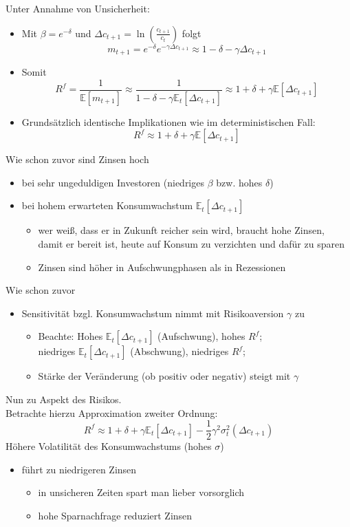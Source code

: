 \documentclass[12pt]{extreport} %
\theoremstyle{named}
\theoremstyle{nnamed}
\theoremstyle{itshape}
\theoremstyle{normal}
\begin{document}
Unter Annahme von Unsicherheit:	
\begin{itemize}
	\item Mit $\beta = e^{-\delta}$ und $\Delta c_{t+1} = \ln \left( \frac{c_{t+1}}{c_t} \right)$ folgt
		$$ m_{t+1} = e^{-\delta} e^{-\gamma \Delta c_{t+1}} \approx 1 - \delta - \gamma \Delta c_{t+1} $$
	\item Somit
		$$ R^f = \frac{1}{\mathbb{E}[m_{t+1}]} \approx \frac{1}{1 - \delta - \gamma \mathbb{E}_t[\Delta c_{t+1}]} \approx 1 + \delta + \gamma \mathbb{E}[\Delta c_{t+1}] $$
	\item Grundsätzlich identische Implikationen wie im deterministischen Fall:
		$$ R^f \approx 1 + \delta + \gamma \mathbb{E} [\Delta c_{t+1}] $$
\end{itemize}
Wie schon zuvor sind Zinsen hoch
\begin{itemize}
			\item bei sehr ungeduldigen Investoren (niedriges $\beta$ bzw. hohes $\delta$)
			\item bei hohem erwarteten Konsumwachstum $\mathbb{E}_t[\Delta c_{t+1}]$
				\begin{itemize}
					\item wer weiß, dass er in Zukunft reicher sein wird, braucht hohe Zinsen, damit er bereit ist, heute auf Konsum zu verzichten und dafür zu sparen
					\item Zinsen sind höher in Aufschwungphasen als in Rezessionen
				\end{itemize}
\end{itemize}
Wie schon zuvor
\begin{itemize}
	\item Sensitivität bzgl. Konsumwachstum nimmt mit Risikoaversion $\gamma$ zu
		\begin{itemize}
			\item Beachte: Hohes $\mathbb{E}_t[\Delta c_{t+1}]$ (Aufschwung), hohes $R^f$; ~\\
				niedriges $\mathbb{E}_t[\Delta c_{t+1}]$ (Abschwung), niedriges $R^f$;
			\item Stärke der Veränderung (ob positiv  oder negativ) steigt mit $\gamma$
		\end{itemize}
\end{itemize}

Nun zu Aspekt des Risikos. ~\\
Betrachte hierzu Approximation zweiter Ordnung:
	$$	R^f \approx 1 + \delta + \gamma \mathbb{E}_t[\Delta c_{t+1}] - \frac{1}{2} \gamma^2 \sigma^2_t (\Delta c_{t+1}) $$
Höhere Volatilität des Konsumwachstums (hohes $\sigma$)
\begin{itemize}
	\item führt zu niedrigeren Zinsen
		\begin{itemize}
			\item in unsicheren Zeiten spart man lieber vorsorglich
			\item hohe Sparnachfrage reduziert Zinsen
		\end{itemize}
\end{itemize}
\end{document}
